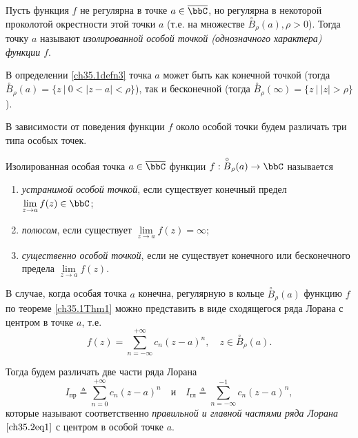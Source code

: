 \begin{leftbar}
\begin{defn}\label{ch35.1defn3}
Пусть функция $f$ не регулярна в точке $a \in \overline{\bbC}$, но регулярна в некоторой проколотой окрестности этой точки $a$ (т.е. на множестве $\overset{\circ}{B}_\rho(a), \rho > 0$). Тогда точку $a$ называют \textit{изолированной особой точкой (однозначного характера) функции $f$}.
\end{defn}

В определении \ref{ch35.1defn3} точка $a$ может быть как конечной точкой (тогда $\overset{\circ}{B}_\rho(a) = \{ z \: \big| \: 0 < |z - a| < \rho\}$), так и бесконечной (тогда $\overset{\circ}{B}_\rho(\infty) = \{ z \: \big| \: |z| > \rho\}$).

В зависимости от поведения функции $f$ около особой точки будем различать три типа особых точек.

\begin{defn}
Изолированная особая точка $a \in \overline{\bbC}$ функции $f : \overset{\circ}{B}_\rho(a) \to \bbC$ называется
\begin{enumerate}
\item \textit{устранимой особой точкой}, если существует конечный предел $\lim\limits_{z \to a} f(z) \in \bbC$;
\item	\textit{полюсом}, если существует $\lim\limits_{z \to a} f(z) = \infty$;
\item \textit{существенно особой точкой}, если не существует конечного или бесконечного предела $\lim\limits_{z \to a} f(z)$.
\end{enumerate}
\end{defn}
\end{leftbar}

В случае, когда особая точка $a$ конечна, регулярную в кольце $\overset{\circ}{B}_\rho(a)$ функцию $f$ по теореме \ref{ch35.1Thm1} можно представить в виде сходящегося ряда Лорана с центром в точке $a$, т.е.
\begin{equation} \label{ch35.2eq1}
f(z) = \sum_{n = -\infty}^{+\infty} c_n (z - a)^n, \quad z \in \overset{\circ}{B}_\rho(a).
\end{equation}

Тогда будем различать две части ряда Лорана
$$
I_{\text{пр}} \triangleq \sum_{n = 0}^{+\infty} c_n (z - a)^n \quad \text{и} \quad I_{\text{гл}} \triangleq \sum_{n = -\infty}^{-1} c_n (z - a)^n,
$$
которые называют соответственно \textit{правильной и главной частями ряда Лорана} $\eqref{ch35.2eq1}$ с центром в особой точке $a$.


